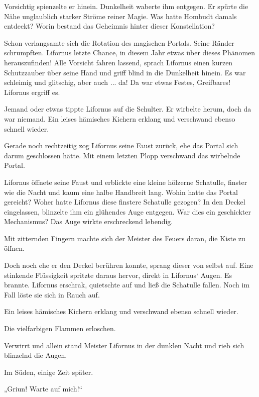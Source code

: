Vorsichtig spienzelte er hinein. Dunkelheit waberte ihm entgegen. Er spürte die Nähe unglaublich starker Ströme reiner Magie. Was hatte Hombudt damals entdeckt? Worin bestand das Geheimnis hinter dieser Konstellation?

Schon verlangsamte sich die Rotation des magischen Portals. Seine Ränder schrumpften. Lifornus letzte Chance, in diesem Jahr etwas über dieses Phänomen herauszufinden! Alle Vorsicht fahren lassend, sprach Lifornus einen kurzen Schutzzauber über seine Hand und griff blind in die Dunkelheit hinein. Es war schleimig und glitschig, aber auch ... da! Da war etwas Festes, Greifbares! Lifornus ergriff es.

Jemand oder etwas tippte Lifornus auf die Schulter. Er wirbelte herum, doch da war niemand. Ein leises hämisches Kichern erklang und verschwand ebenso schnell wieder.

Gerade noch rechtzeitig zog Lifornus seine Faust zurück, ehe das Portal sich darum geschlossen hätte. Mit einem letzten Plopp verschwand das wirbelnde Portal.

Lifornus öffnete seine Faust und erblickte eine kleine hölzerne Schatulle, finster wie die Nacht und kaum eine halbe Handbreit lang. Wohin hatte das Portal gereicht? Woher hatte Lifornus diese finstere Schatulle gezogen? In den Deckel eingelassen, blinzelte ihm ein glühendes Auge entgegen. War dies ein geschickter Mechanismus? Das Auge wirkte erschreckend lebendig.

Mit zitternden Fingern machte sich der Meister des Feuers daran, die Kiste zu öffnen.

Doch noch ehe er den Deckel berühren konnte, sprang dieser von selbst auf. Eine stinkende Flüssigkeit spritzte daraus hervor, direkt in Lifornus‘ Augen. Es brannte. Lifornus erschrak, quietschte auf und ließ die Schatulle fallen. Noch im Fall löste sie sich in Rauch auf.

Ein leises hämisches Kichern erklang und verschwand ebenso schnell wieder.

Die vielfarbigen Flammen erloschen.

Verwirrt und allein stand Meister Lifornus in der dunklen Nacht und rieb sich blinzelnd die Augen.\bigskip






Im Süden, einige Zeit später.\bigskip



„Griun! Warte auf mich!“

